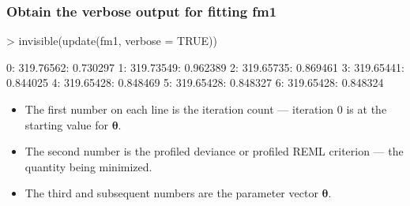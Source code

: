 \begin{frame}[fragile]
  \frametitle{Obtain the verbose output for fitting fm1}
\begin{Schunk}
\begin{Sinput}
> invisible(update(fm1, verbose = TRUE))
\end{Sinput}
\begin{Soutput}
  0:     319.76562: 0.730297
  1:     319.73549: 0.962389
  2:     319.65735: 0.869461
  3:     319.65441: 0.844025
  4:     319.65428: 0.848469
  5:     319.65428: 0.848327
  6:     319.65428: 0.848324
\end{Soutput}
\end{Schunk}
\begin{itemize}
\item The first number on each line is the iteration count --- iteration
  0 is at the starting value for $\bm\theta$.
\item The second number is the profiled deviance or profiled REML
  criterion --- the quantity being minimized.
\item The third and subsequent numbers are the parameter vector $\bm\theta$.
\end{itemize}
\end{frame}

